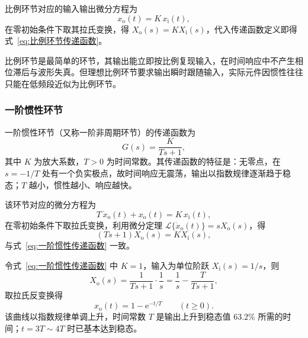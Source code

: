 比例环节对应的输入输出微分方程为
\begin{equation}
    x_{\mathrm{o}}(t)=K\,x_{\mathrm{i}}(t),
    \label{eq:比例环节时域}
\end{equation}
在零初始条件下取其拉氏变换，得 $X_{\mathrm{o}}(s)=KX_{\mathrm{i}}(s)$，代入传递函数定义即得式~\eqref{eq:比例环节传递函数}。


\begin{remark}
    比例环节是最简单的环节，其输出能立即按比例复现输入，在时间响应中不产生相位滞后与波形失真。但理想比例环节要求输出瞬时跟随输入，实际元件因惯性往往只能在低频段近似为比例环节。
\end{remark}

\subsubsection{一阶惯性环节}

\begin{definition}[一阶惯性环节]
    一阶惯性环节（又称一阶非周期环节）的传递函数为
    \begin{equation}
        G(s)=\frac{K}{Ts+1},
        \label{eq:一阶惯性传递函数}
    \end{equation}
    其中 $K$ 为放大系数，$T>0$ 为时间常数。其传递函数的特征是：无零点，在 $s=-1/T$ 处有一个负实极点，故时间响应无震荡，输出以指数规律逐渐趋于稳态；$T$ 越小，惯性越小、响应越快。
\end{definition}

该环节对应的微分方程为
\begin{equation}
    T\,\dot{x}_{\mathrm{o}}(t)+x_{\mathrm{o}}(t)=K\,x_{\mathrm{i}}(t),
    \label{eq:一阶惯性时域}
\end{equation}
在零初始条件下取拉氏变换，利用微分定理 $\mathcal{L}\{\dot{x}_{\mathrm{o}}(t)\}=sX_{\mathrm{o}}(s)$，得
\[
(Ts+1)X_{\mathrm{o}}(s)=KX_{\mathrm{i}}(s),
\]
与式~\eqref{eq:一阶惯性传递函数} 一致。


\begin{property}[单位阶跃响应]
    令式~\eqref{eq:一阶惯性传递函数} 中 $K=1$，输入为单位阶跃 $X_{\mathrm{i}}(s)=1/s$，则
    \[
    X_{\mathrm{o}}(s)=\frac{1}{Ts+1}\cdot\frac{1}{s}
    =\frac{1}{s}-\frac{T}{Ts+1},
    \]
    取拉氏反变换得
    \begin{equation}
        x_{\mathrm{o}}(t)=1-\mathrm{e}^{-t/T}\qquad(t\ge 0).
    \end{equation}
    该曲线以指数规律单调上升，时间常数 $T$ 是输出上升到稳态值 $63.2\%$ 所需的时间；$t=3T\sim4T$ 时已基本达到稳态。
\end{property}

